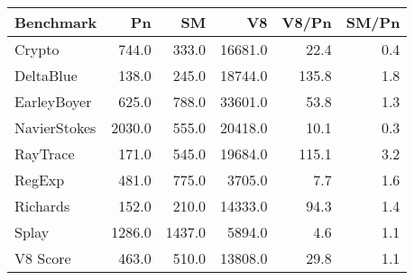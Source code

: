 \begin{tabular}{|l|r|r|r|r|r|}
  \hline
  Benchmark & Pn & SM & V8 & V8/Pn & SM/Pn \\
  \hline \hline
  Crypto & 744.0 & 333.0 & 16681.0 & 22.4 & 0.4\\
  \hline
  DeltaBlue & 138.0 & 245.0 & 18744.0 & 135.8 & 1.8\\
  \hline
  EarleyBoyer & 625.0 & 788.0 & 33601.0 & 53.8 & 1.3\\
  \hline
  NavierStokes & 2030.0 & 555.0 & 20418.0 & 10.1 & 0.3\\
  \hline
  RayTrace & 171.0 & 545.0 & 19684.0 & 115.1 & 3.2\\
  \hline
  RegExp & 481.0 & 775.0 & 3705.0 & 7.7 & 1.6\\
  \hline
  Richards & 152.0 & 210.0 & 14333.0 & 94.3 & 1.4\\
  \hline
  Splay & 1286.0 & 1437.0 & 5894.0 & 4.6 & 1.1\\
  \hline
  \hline
  V8 Score & 463.0 & 510.0 & 13808.0 & 29.8 & 1.1\\
  \hline
\end{tabular}
